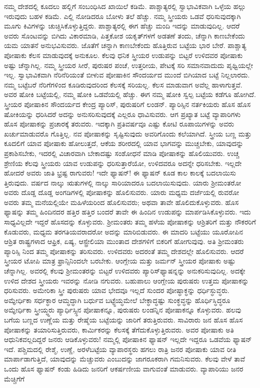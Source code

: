 ನಮ್ಮ ದೇಶದಲ್ಲಿ ಕೂದಲು ಹಲ್ಲಿಗೆ ಸಂಬಂಧಿಸಿದ ಖಾಯಿಲೆ ಕಡಿಮೆ. ಪಾಶ್ಚಾತ್ಯರಲ್ಲಿ ಸ್ವಾಭಾವಿಕವಾಗಿ ಒಳ್ಳೆಯ ಹಲ್ಲು ಇರುವುದು ಬಹಳ ಕಡಿಮೆ. ಎಲ್ಲಿ ನೋಡಿದರೂ ಬೋಳು ತಲೆ ಹೆಚ್ಚು. ನಮ್ಮ ಸ್ತ್ರೀಯರು ಒಡವೆ ಧರಿಸುವುದಕ್ಕಾಗಿ ಮೂಗು ಕಿವಿಗಳನ್ನು ಚುಚ್ಚಿಸಿಕೊಳ್ಳುತ್ತಿದ್ದರು. ಪಾಶ್ಚಾತ್ಯರಲ್ಲಿ ಈಗ ಹೆಚ್ಚು ಮಂದಿ ಇದನ್ನು ಮಾಡುವುದಿಲ್ಲ. ಆದರೆ ಅವರು ಸೊಂಟವನ್ನು ಬಿಗಿದು ವಿಕಾರಮಾಡಿ, ಪಿತ್ತಕೋಶ ಯಕೃತ್​ಗಳಗೆ ಅಡತಣೆ ತಂದು, ಚೆನ್ನಾಗಿ ಕಾಣಬೇಕೆಂದು ಯಮ ಯಾತನೆ ಅನುಭವಿಸುವರು. ಜೊತೆಗೆ ಚನ್ನಾಗಿ ಕಾಣಬೇಕೆಂದು ಹೊತ್ತಿರುವ ಬಟ್ಟೆಯ ಭಾರ ಬೇರೆ. ಪಾಶ್ಚಾತ್ಯ ಪೋಷಾಕು ಕೆಲಸ ಮಾಡುವುದಕ್ಕೆ ಅನುಕೂಲ. ಕೆಲವು ಧನಿಕ ಸ್ತ್ರೀಯರ ಉಡುಪನ್ನು ಬಿಟ್ಟರೆ ಉಳಿದವರ ಪೋಷಾಕು ಅಷ್ಟು ಚೆನ್ನಾಗಿಲ್ಲ. ನಮ್ಮ ಸ್ತ್ರೀಯರ ಸೀರೆ, ಪುರುಷರ ಪಂಚೆ, ಉತ್ತರೀಯ, ಪೇಟಕ್ಕೆ ಸರಿ ಸಮಾನವಾದುದು ಪೃಥ್ವಿಯಲ್ಲೇ ಇಲ್ಲ. ಸ್ವಾಭಾವಿಕವಾಗಿ ನೆರಿನೆರಿಯಂತೆ ಬೀಳುವ ಪೋಷಾಕಿನ ಸೌಂದರ್ಯದ ಮುಂದೆ ಬಿಗಿಯಾದ ಬಟ್ಟೆ ನಿಲ್ಲಲಾರದು. ನಮ್ಮ ಬಟ್ಟೆಬರೆ ನೆರಿಗೆಗಳಿಂದ ಕೂಡಿರುವುದರಿಂದ ಕೆಲಸಕ್ಕೆ ಸರಿಯಲ್ಲ. ಕೆಲಸ ಮಾಡುವಾಗ ಅವೆಲ್ಲ ಹಾಳಾಗುತ್ತವೆ. ಅವರ ಷೋಕಿ ಬಟ್ಟೆಯಲ್ಲಿ, ನಮ್ಮ ಷೋಕಿ ಒಡವೆಯಲ್ಲಿ ಹೆಚ್ಚು. ಈಗ ನಮ್ಮ ಷೋಕಿ ಸ್ವಲ್ಪ ಬಟ್ಟೆಯ ಕಡೆಗೂ ಹೋಗಿದೆ. ಸ್ತ್ರೀಯರ ಪೋಷಾಕಿನ ಸೌಂದರ್ಯದ ಕೇಂದ್ರ ಪ್ಯಾರಿಸ್​, ಪುರುಷರಿಗೆ ಲಂಡನ್​. ಪ್ಯಾರಿಸ್ಸಿನ ನರ್ತಕಿಯರು ಹೊಸ ಹೊಸ ಷೋಕಿಯನ್ನು ಧರಿಸಿದರೆ ಅದನ್ನು ಅನುಸರಿಸುವುದಕ್ಕೆ ಎಲ್ಲರೂ ಧಾವಿಸುವರು. ಆಗ ಪ್ರಖ್ಯಾತ ಬಟ್ಟೆ ವ್ಯಾಪಾರಿಗಳು ಹೊಸ ಪೋಷಾಕನ್ನು ಪ್ರಚಾರಕ್ಕೆ ತರುವರು. ಇದಕ್ಕಾಗಿ ಪ್ರತಿವರ್ಷವೂ ಎಷ್ಟು ಕೋಟಿ ರೂಪಾಯಿಗಳನ್ನು ಅವರು ಖರ್ಚುಮಾಡುವರೊ ಗೊತ್ತಿಲ್ಲ. ನವ ಪೋಷಾಕನ್ನು ಸೃಷ್ಟಿಸುವುದು ಅವರಿಗೊಂದು ಕಲೆಯಾಗಿದೆ. ಸ್ತ್ರೀಯ ಬಣ್ಣ ಮತ್ತು ಕೂದಲಿಗೆ ಯಾವ ಪೋಷಾಕು ಹೋಲುತ್ತದೆ, ಆಕೆಯ ಶರೀರದಲ್ಲಿ ಯಾವ ಭಾಗವನ್ನು ಮುಚ್ಚಬೇಕು, ಯಾವುದನ್ನು ಪ್ರಕಾಶಿಸಬೇಕು, ಇದರಲ್ಲಿ ವಿಚಾರವಾಗಿ ಬೇಕಾದಷ್ಟು ಸಂಶೋಧನೆ ಮಾಡಿ ಪೋಷಾಕನ್ನು ಹೊಲಿಯುವರು. ಉಚ್ಚ ಶ್ರೇಣಿಯ ಕೆಲವು ಸ್ತ್ರೀಯರು ಯಾವ ಉಡುಪನ್ನು ಧರಿಸುತ್ತಾರೆಯೋ, ಉಳಿದವರೂ ಅದನ್ನೇ ಧರಿಸಬೇಕು. ಇಲ್ಲದೇ ಹೋದರೆ ಅವರು ಜಾತಿ ಭ್ರಷ್ಟ ರಾಗುವರು! ಇದೇ ಫ್ಯಾಷನ್​! ಈ ಫ್ಯಾಷನ್​ ಕೂಡ ಕಾಲ ಕಾಲಕ್ಕೆ ಬದಲಾಯಿಸು ತ್ತಿರುವುದು. ವರ್ಷದ ನಾಲ್ಕು ಋತುಗಳಲ್ಲಿ ನಾಲ್ಕು ಸಾರಿಯಾದರೂ ಬದಲಾಯಿಸುವುದು. ಯಾರು ಶ‍್ರೀಮಂತರೋ ಅವರು ದೊಡ್ಡ ದೊಡ್ಡ ಅಂಗಡಿಗಳಲ್ಲಿ ಪೋಷಾಕನ್ನು ಹೊಲಿಸುವರು. ಯಾರು ಮಧ್ಯಮ ದರ್ಜೆಯಲ್ಲಿ ರುವರೋ ಅವರು ತಮ್ಮ ಮನೆಯಲ್ಲಿಯೇ ಮಹಿಳೆಯರಿಂದ ಹೊಲಿಸುವರು; ಅಥವಾ ತಾವೇ ಹೊಲಿದುಕೊಳ್ಳುವರು. ಹೊಸ ಫ್ಯಾಷನ್ನು ತಮ್ಮ ಹಿಂದಿನದರ ಹತ್ತಿರ ಹತ್ತಿರ ಬಂದರೆ ತಾವೇ ಈ ಹಿಂದಿನ ಉಡುಪನ್ನು ಮಾರ್ಪಡಿಸಿಕೊಳ್ಳುವರು. ಇದು ಸಾಧ್ಯವಿಲ್ಲದೇ ಇದ್ದರೆ ಹೊಸದನ್ನು ಕೊಳ್ಳುವರು. ಶ‍್ರೀಮಂತರು ತಮ್ಮ ಹಳೆಯ ಪೋಷಾಕನ್ನು ಆಶ್ರಿತರಿಗೆ ಮತ್ತು ನೌಕರರಿಗೆ ಕೊಡುವರು, ಮಧ್ಯಮ ತರಗತಿಯವರಾದರೋ ಅದನ್ನು ಮಾರಿಬಿಡುವರು. ಈ ಮಾದರಿ ಬಟ್ಟೆಯು ಯೂರೋಪಿನ ಆಶ್ರಿತ ರಾಷ್ಟ್ರಗಳಾದ ಆಫ್ರಿಕ, ಏಷ್ಯ, ಆಸ್ಟ್ರೇಲಿಯಾ ಮುಂತಾದ ದೇಶಗಳಿಗೆ ಬಿಕರಿಗೆ ಹೋಗುವುವು. ಅತಿ ಶ‍್ರೀಮಂತರು ಪ್ಯಾರಿಸ್ಸಿ ನಿಂದ ತಮ್ಮ ಪೋಷಾಕನ್ನು ತರಿಸುವರು. ಉಳಿದವರು ಅದರಂತೆ ತಮ್ಮ ದೇಶದಲ್ಲೇ ಹೊಲಿಸುವರು. ಆದರೆ ಸ್ತ್ರೀಯರ ಟೋಪಿ ಮಾತ್ರ ಫ್ರಾನ್ಸಿನಿಂದಲೇ ಬರಬೇಕು. ಆಂಗ್ಲೇಯ ಮತ್ತು ಜರ್ಮನ್​ ಸ್ತ್ರೀಯರ ಪೋಷಾಕು ಅಷ್ಟು ಚೆನ್ನಾಗಿಲ್ಲ. ಅವರಲ್ಲಿ ಕೆಲವು ಶ‍್ರೀಮಂತರನ್ನು ಬಿಟ್ಟರೆ ಉಳಿದವರು ಪ್ಯಾರಿಸ್​ ಫ್ಯಾಷನ್ನನ್ನು ಅನುಕರಿಸುವುದಿಲ್ಲ. ಅದಕ್ಕೇ ಉಳಿದ ದೇಶದ ಸ್ತ್ರೀಯರು ಇವರನ್ನು ನೋಡಿ ನಗುವರು. ಬಹುಪಾಲು ಆಂಗ್ಲೇಯ ಪುರುಷರು ಉತ್ತಮ ಪೋಷಾಕನ್ನು ಧರಿಸುವರು. ಅಮೇರಿಕಾ ಸ್ತ್ರೀ ಪುರುಷರು ಯಾವ ಭೇದವೂ ಇಲ್ಲದೆ ಸುಂದರ ಪೋಷ್ಧಾಕ್ಧನ್ನು ಧರ್ಧಿಸ್ಧುವ್ಧರು. ಅಮ್ಧೇರ್ಧಿಕಾ ಸರ್ಧಕ್ಧಾರ ಆಮ್ಧದ್ಧಾಗಿ ಬರ್ಧುವ ಬಟ್ಟ್ಧೆಯ್ಧಮೇಲೆ ಬೇಕ್ಧಾದ್ಧಷ್ಟು ಸುಂಕ್ಧವ್ಧನ್ನು ಹೊರ್ಧಿಸ್ಧಿದ್ಧರೂ ಅಮ್ಧೇರ್ಧಿಕಾ ಸ್ತ್ರೀಯ್ಧ್ಧರು ಪ್ಯಾರ್ಧಿಸ್ಸ್ಧಿನ ಪೋಷಾಕನ್ನೂ, ಪುರುಷರು ಲಂಡನ್ನಿನ ಪೋಷಾಕನ್ನೂ ಕೊಳ್ಳುವರು. ಹಲವು ಬಗೆಯ ಬಣ್ಣದ ಉಣ್ಣೆಯ ಮತ್ತು ರೇಷ್ಮೆಯ ಬಟ್ಟೆಯನ್ನು ಜಾರಿಗೆ ತರುತ್ತಿರುವರು. ಸಾವಿರಾರು ಜನ ಹೊಸ ಹೊಸ ಪೋಷಾಕನ್ನು ತಯಾರಿಸುತ್ತಿರುವರು, ಕಾರ್ಮಿಕರನ್ನು ಕೆಲಸಕ್ಕೆ ತೆಗೆದುಕೊಳ್ಳುತ್ತಿರುವರು. ಅವರ ಪೋಷಾಕು ಅತಿ ಆಧುನಿಕವಲ್ಲದಿದ್ದರೆ ಜನರು ಆಡಿಕೊಳ್ಳುವರು! ನಮ್ಮಲ್ಲಿ ಪೋಷಾಕಿನ ಫ್ಯಾಷನ್​ ಇಲ್ಲದೇ ಇದ್ದರೂ ಒಡವೆಯ ಫ್ಯಾಷನ್​ ಇದೆ. ಪಶ್ಚಿಮದಲ್ಲಿ ರೇಶ್ಮೆ, ಉಣ್ಣೆ, ಅರಳೆಬಟ್ಟೆಯ ವ್ಯಾಪಾರಸ್ಥರು ಹಗಲು ರಾತ್ರಿ ಜನರ ಪೋಷಾಕು ಯಾವ ರೀತಿ ಮಾರ್ಪಾಡಾಗುತ್ತಿದೆ, ಯಾವುದನ್ನು ಮೆಚ್ಚುವರು ಎಂಬುದನ್ನು ಜಾಗರೂಕರಾಗಿ ಗಮನಿಸುವರು. ಕೆಲವು ವೇಳೆ ತಾವೆ ಒಂದು ಹೊಸ ಫ್ಯಾಷನ್​ ಕಂಡು ಹಿಡಿದು ಜನರಿಗೆ ಆಕರ್ಷಣೀಯ ವಾಗುವಂತೆ ಮಾಡುವರು. ವ್ಯಾಪಾರಿಯು ಜನರ ಮೆಚ್ಚಿಗೆಗೆ 